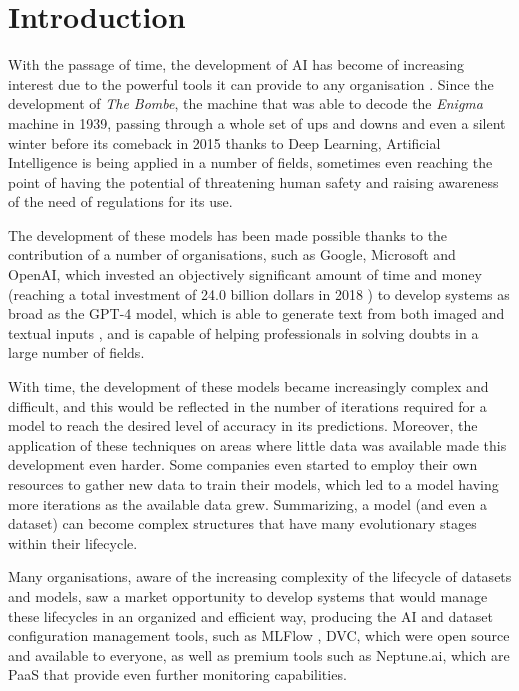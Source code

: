 \chapter{Introduction}
\label{cap:Introduction}

With the passage of time, the development of \acrfull{AI} has become of increasing interest due to the powerful tools it can provide to any
organisation \cite{AIRise}. Since the development of \emph{The Bombe}, the machine that was able to decode the \emph{Enigma} machine in 1939,
passing through a whole set of ups and downs and even a silent winter before its comeback in 2015 thanks to Deep Learning, Artificial Intelligence
is being applied in a number of fields, sometimes even reaching the point of having the potential of threatening human safety and raising awareness
of the need of regulations for its use.

The development of these models has been made possible thanks to the contribution of a number of organisations, such as Google, Microsoft and OpenAI,
which invested an objectively significant amount of time and money (reaching a total investment of 24.0 billion dollars in 2018 \cite{AIRise}) to develop systems as
broad as the GPT-4 model, which is able to generate text from both imaged and textual inputs \cite{GPT4}, and is capable of helping professionals in solving
doubts in a large number of fields.

With time, the development of these models became increasingly complex and difficult, and this would be reflected in the number of iterations required for
a model to reach the desired level of accuracy in its predictions. Moreover, the application of these techniques on areas where little data was available
made this development even harder. Some companies even started to employ their own resources to gather new data to train their models, which led to a model
having more iterations as the available data grew. Summarizing, a model (and even a dataset) can become complex structures that have many evolutionary
stages within their lifecycle.

Many organisations, aware of the increasing complexity of the lifecycle of datasets and models, saw a market opportunity to develop systems that would manage
these lifecycles in an organized and efficient way, producing the AI and dataset configuration management tools, such as MLFlow \cite{MLflow}, DVC, which were
open source and available to everyone, as well as premium tools such as Neptune.ai, which are \acrfull{PaaS} that provide even further monitoring
capabilities.

